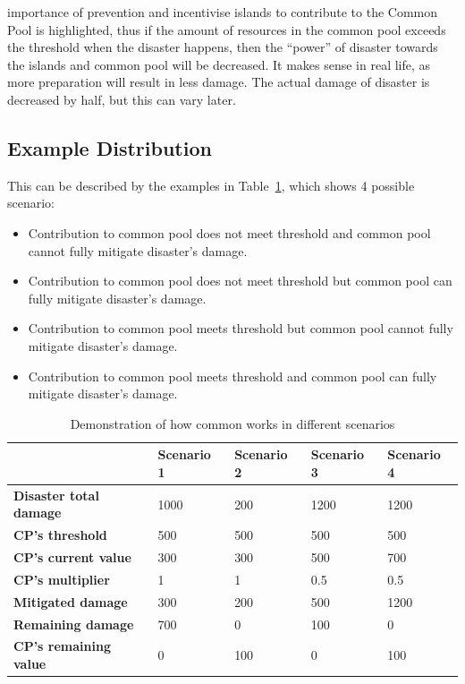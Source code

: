 importance of prevention and incentivise islands to contribute to the Common Pool is highlighted, thus if the amount of resources in the common pool exceeds the threshold when the disaster happens, then the “power” of disaster towards the islands and common pool will be decreased. It makes sense in real life, as more preparation will result in less damage. The actual damage of disaster is decreased by half, but this can vary later.

\subsection{Example Distribution}
This can be described by the examples in Table~\ref{tab:Demonstration of how common works in different scenarios}, which shows 4 possible scenario:

\begin{itemize}
    \item Contribution to common pool does not meet threshold and common pool cannot fully mitigate disaster’s damage.
    \item Contribution to common pool does not meet threshold but common pool can fully mitigate disaster’s damage.
    \item Contribution to common pool meets threshold but common pool cannot fully mitigate disaster’s damage.
    \item Contribution to common pool meets threshold and common pool can fully mitigate disaster’s damage.
\end{itemize}

\begin{table}[!htb]
\begin{center} 
\begin{tabular}{|p{0.9in}|p{0.9in}|p{0.9in}|p{0.9in}|p{0.9in}|} \hline
& \textbf{Scenario 1} & \textbf{Scenario 2} & \textbf{Scenario 3} & \textbf{Scenario 4} \\ \hline
\textbf{Disaster total damage} & 1000 & 200 & 1200 & 1200 \\ \hline
\textbf{CP's threshold} & 500 & 500 & 500 & 500 \\ \hline
\textbf{CP's current value} & 300 & 300 & 500 & 700 \\ \hline
\textbf{CP's multiplier} & 1 & 1 & 0.5 & 0.5 \\ \hline
\textbf{Mitigated damage} & 300 & 200 & 500 & 1200 \\ \hline
\textbf{Remaining damage} & 700 & 0 & 100 & 0 \\ \hline
\textbf{CP's remaining value} & 0 & 100 & 0 & 100 \\ \hline
\end{tabular}
\caption{Demonstration of how common works in different scenarios}
\label{tab:Demonstration of how common works in different scenarios}
\end{center} 
\end{table}

